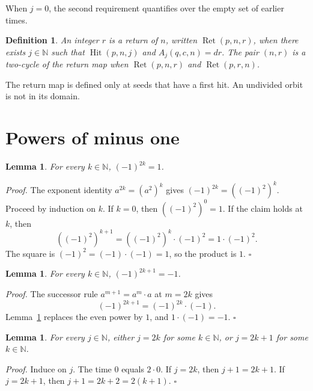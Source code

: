 \documentclass[11pt,letterpaper]{article}
\newcommand{\N}{\mathbb{N}}
\newtheorem{lemma}[theorem]{Lemma}
\newtheorem{definition}[theorem]{Definition}
\newenvironment{proof}{\noindent\textit{Proof.}}{\hfill\(\square\)}
\begin{document}
When \(j=0\), the second requirement quantifies over the empty set of earlier
times.

\begin{definition}
\label{def:return}
An integer \(r\) is a return of \(n\), written
\(\operatorname{Ret}(p,n,r)\), when there exists \(j\in\N\) such that
\(\operatorname{Hit}(p,n,j)\) and \(A_j(q,c,n)=dr\). The pair \((n,r)\) is a
two-cycle of the return map when \(\operatorname{Ret}(p,n,r)\) and
\(\operatorname{Ret}(p,r,n)\).
\end{definition}

The return map is defined only at seeds that have a first hit. An undivided
orbit is not in its domain.

\section{Powers of minus one}

\begin{lemma}
\label{lem:pow-even}
For every \(k\in\N\), \((-1)^{2k}=1\).
\end{lemma}

\begin{proof}
The exponent identity \(a^{2k}=(a^2)^k\) gives
\((-1)^{2k}=((-1)^2)^k\). Proceed by induction on \(k\). If \(k=0\), then
\(((-1)^2)^0=1\). If the claim holds at \(k\), then
\[
((-1)^2)^{k+1}=((-1)^2)^k\cdot(-1)^2=1\cdot(-1)^2.
\]
The square is \((-1)^2=(-1)\cdot(-1)=1\), so the product is \(1\).
\end{proof}

\begin{lemma}
\label{lem:pow-odd}
For every \(k\in\N\), \((-1)^{2k+1}=-1\).
\end{lemma}

\begin{proof}
The successor rule \(a^{m+1}=a^m\cdot a\) at \(m=2k\) gives
\[
(-1)^{2k+1}=(-1)^{2k}\cdot(-1).
\]
Lemma~\ref{lem:pow-even} replaces the even power by \(1\), and
\(1\cdot(-1)=-1\).
\end{proof}

\begin{lemma}
\label{lem:parity}
For every \(j\in\N\), either \(j=2k\) for some \(k\in\N\), or \(j=2k+1\) for
some \(k\in\N\).
\end{lemma}

\begin{proof}
Induce on \(j\). The time \(0\) equals \(2\cdot 0\). If \(j=2k\), then
\(j+1=2k+1\). If \(j=2k+1\), then \(j+1=2k+2=2(k+1)\).
\end{proof}
\end{document}
